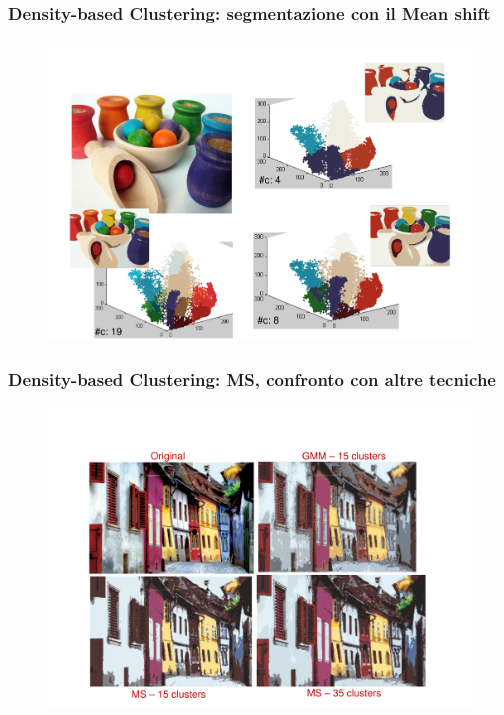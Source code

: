 \begin{frame}

	\frametitle{{\color{GradientDescentDiagramRed}Density-based Clustering}: segmentazione con il Mean shift}

		\begin{figure}[!htbp]
				\centering
				\includegraphics[angle=0,width=0.85\linewidth]{images/unsupervised/non_parametric/meanshift_pots.pdf}
			\end{figure}

\end{frame}


\begin{frame}

	\frametitle{{\color{GradientDescentDiagramRed}Density-based Clustering}: MS, confronto con altre tecniche}

		\begin{figure}[!htbp]
				\centering
				\includegraphics[angle=0,width=0.80\linewidth]{images/unsupervised/non_parametric/meanshift_compared.pdf}
			\end{figure}

\end{frame}


